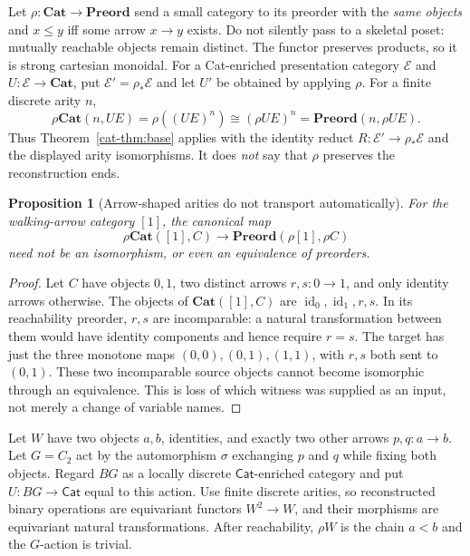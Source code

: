 \documentclass[11pt]{article}
\newtheorem{proposition}[theorem]{Proposition}
\theoremstyle{definition}
\theoremstyle{remark}
\newcommand{\Cat}{\mathbf{Cat}}
\newcommand{\Preord}{\mathbf{Preord}}
\newcommand{\E}{\mathcal E}
\newcommand{\id}{\operatorname{id}}
\begin{document}
Let $\rho:\Cat\to\Preord$ send a small category to its preorder with the
\emph{same objects} and $x\le y$ iff some arrow $x\to y$ exists.
Do not silently pass to a skeletal poset: mutually reachable objects
remain distinct. The functor preserves products, so it is strong
cartesian monoidal. For a Cat-enriched presentation category $\E$ and
$U:\E\to\Cat$, put $\E'=\rho_*\E$ and let $U'$ be obtained by applying
$\rho$. For a finite discrete arity $n$,
\[
 \rho\Cat(n,U E)=\rho((U E)^n)\cong(\rho U E)^n
      =\Preord(n,\rho U E).
\]
Thus Theorem~\ref{cat-thm:base} applies with the identity reduct
$R:\E'\to\rho_*\E$ and the displayed arity isomorphisms. It does
\emph{not} say that $\rho$ preserves the reconstruction ends.

\begin{proposition}[Arrow-shaped arities do not transport automatically]
For the walking-arrow category $[1]$, the canonical map
\[
 \rho\Cat([1],C)\longrightarrow\Preord(\rho[1],\rho C)
\]
need not be an isomorphism, or even an equivalence of preorders.
\end{proposition}
\begin{proof}
Let $C$ have objects $0,1$, two distinct arrows $r,s:0\to1$, and only
identity arrows otherwise. The objects of $\Cat([1],C)$ are
$\id_0,\id_1,r,s$. In its reachability preorder, $r,s$ are incomparable:
a natural transformation between them would have identity components
and hence require $r=s$. The target has just the three monotone maps
$(0,0),(0,1),(1,1)$, with $r,s$ both sent to $(0,1)$.
These two incomparable source objects cannot become isomorphic through
an equivalence. This is loss of which witness was supplied as an input,
not merely a change of variable names.
\end{proof}

Let $W$ have two objects $a,b$, identities, and exactly two other arrows
$p,q:a\to b$. Let $G=C_2$ act by the automorphism $\sigma$ exchanging
$p$ and $q$ while fixing both objects. Regard $BG$ as a locally discrete
$\mathsf{Cat}$-enriched category and put $U:BG\to\mathsf{Cat}$ equal to
this action. Use finite discrete arities, so reconstructed binary
operations are equivariant functors $W^2\to W$, and their morphisms are
equivariant natural transformations. After reachability, $\rho W$ is the
chain $a<b$ and the $G$-action is trivial.
\end{document}
